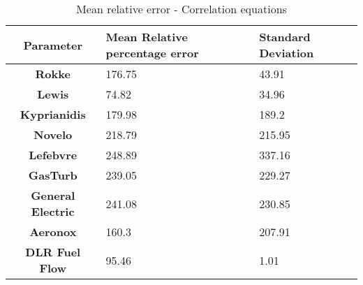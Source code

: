 \begin{table}[h!]
  \centering
  \begin{tabularx}{\textwidth}{||c|X|X||}
  \hline
    \cellcolor{gray!20}\textbf{Parameter} & \cellcolor{gray!20}\textbf{Mean Relative percentage error} & \cellcolor{gray!20}\textbf{Standard Deviation} \\ [0.5ex]
  \hline\hline
\centering
    \cellcolor{gray!20}\textbf{Rokke} & 176.75 & 43.91 \\
  \hline
    \cellcolor{gray!20}\textbf{Lewis} & 74.82 & 34.96 \\
  \hline
    \cellcolor{gray!20}\textbf{Kyprianidis} & 179.98 & 189.2 \\
  \hline
    \cellcolor{gray!20}\textbf{Novelo} & 218.79 & 215.95 \\
  \hline
    \cellcolor{gray!20}\textbf{Lefebvre} & 248.89 & 337.16 \\
  \hline
    \cellcolor{gray!20}\textbf{GasTurb} & 239.05 & 229.27 \\
  \hline
    \cellcolor{gray!20}\textbf{General Electric} & 241.08 & 230.85 \\
  \hline
    \cellcolor{gray!20}\textbf{Aeronox} & 160.3 & 207.91 \\
  \hline
    \cellcolor{gray!20}\textbf{DLR Fuel Flow} & 95.46 & 1.01 \\
  \hline
  \end{tabularx}
  \caption{Mean relative error - Correlation equations}
  \label{meanEC}
\end{table}
